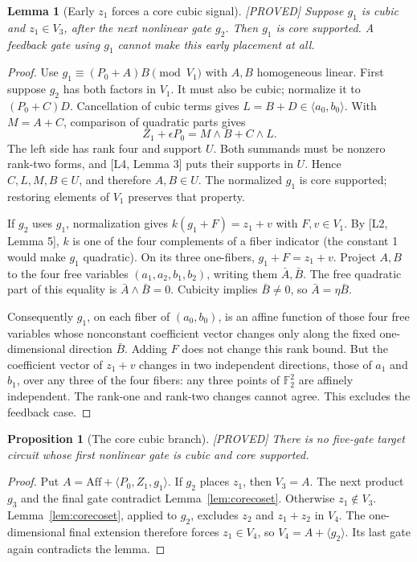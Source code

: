 \documentclass[11pt,a4paper]{article}
\newtheorem{lemma}[theorem]{Lemma}
\newtheorem{proposition}[theorem]{Proposition}
\newcommand{\Aff}{\mathrm{Aff}}
\newcommand{\status}[1]{\hfill\textsf{[#1]}}
\begin{document}
\begin{lemma}[Early $z_1$ forces a core cubic signal]\label{lem:earlycore}\status{PROVED}
Suppose $g_1$ is cubic and $z_1\in V_3$, after the next nonlinear gate $g_2$. Then $g_1$ is core supported. A feedback gate using $g_1$ cannot make this early placement at all.
\end{lemma}
\begin{proof}
Use $g_1\equiv(P_0+A)B\pmod{V_1}$ with $A,B$ homogeneous linear. First suppose $g_2$ has both factors in $V_1$. It must also be cubic; normalize it to $(P_0+C)D$. Cancellation of cubic terms gives $L=B+D\in\langle a_0,b_0\rangle$. With $M=A+C$, comparison of quadratic parts gives
\[
Z_1+\epsilon P_0=M\wedge B+C\wedge L.
\]
The left side has rank four and support $U$. Both summands must be nonzero rank-two forms, and [L4, Lemma 3] puts their supports in $U$. Hence $C,L,M,B\in U$, and therefore $A,B\in U$. The normalized $g_1$ is core supported; restoring elements of $V_1$ preserves that property.

If $g_2$ uses $g_1$, normalization gives $k(g_1+F)=z_1+v$ with $F,v\in V_1$. By [L2, Lemma 5], $k$ is one of the four complements of a fiber indicator (the constant 1 would make $g_1$ quadratic). On its three one-fibers, $g_1+F=z_1+v$. Project $A,B$ to the four free variables $(a_1,a_2,b_1,b_2)$, writing them $\bar A,\bar B$. The free quadratic part of this equality is $\bar A\wedge\bar B=0$. Cubicity implies $\bar B\ne0$, so $\bar A=\eta\bar B$.

Consequently $g_1$, on each fiber of $(a_0,b_0)$, is an affine function of those four free variables whose nonconstant coefficient vector changes only along the fixed one-dimensional direction $\bar B$. Adding $F$ does not change this rank bound. But the coefficient vector of $z_1+v$ changes in two independent directions, those of $a_1$ and $b_1$, over any three of the four fibers: any three points of $\mathbb F_2^2$ are affinely independent. The rank-one and rank-two changes cannot agree. This excludes the feedback case.
\end{proof}

\begin{proposition}[The core cubic branch]\label{prop:corebranch}\status{PROVED}
There is no five-gate target circuit whose first nonlinear gate is cubic and core supported.
\end{proposition}
\begin{proof}
Put $A=\Aff+\langle P_0,Z_1,g_1\rangle$. If $g_2$ places $z_1$, then $V_3=A$. The next product $g_3$ and the final gate contradict Lemma~\ref{lem:corecoset}. Otherwise $z_1\notin V_3$. Lemma~\ref{lem:corecoset}, applied to $g_2$, excludes $z_2$ and $z_1+z_2$ in $V_4$. The one-dimensional final extension therefore forces $z_1\in V_4$, so $V_4=A+\langle g_2\rangle$. Its last gate again contradicts the lemma.
\end{proof}
\end{document}
